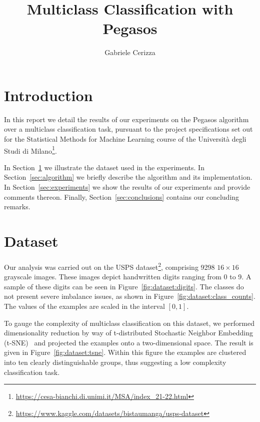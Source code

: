 \documentclass[runningheads]{llncs}
\begin{document}
\title{
    Multiclass Classification with Pegasos
}
\author{Gabriele Cerizza}


\maketitle

\section*{Introduction}
\label{sec:introduction}

In this report we detail the results of our experiments on the Pegasos algorithm~\cite{shalev-pegasos-2011} over a multiclass classification task, pursuant to the project specifications set out for the Statistical Methods for Machine Learning course of the Università degli Studi di Milano\footnote{\url{https://cesa-bianchi.di.unimi.it/MSA/index\_21-22.html}}. 

In Section~\ref{sec:dataset} we illustrate the dataset used in the experiments. In Section~\ref{sec:algorithm} we briefly describe the algorithm and its implementation. In Section~\ref{sec:experiments} we show the results of our experiments and provide comments thereon. Finally, Section~\ref{sec:conclusions} contains our concluding remarks. 

\section{Dataset}
\label{sec:dataset}

Our analysis was carried out on the USPS dataset\footnote{\url{https://www.kaggle.com/datasets/bistaumanga/usps-dataset}}, comprising 9298 $16\times16$ grayscale images. These images depict handwritten digits ranging from 0 to 9. A sample of these digits can be seen in Figure~\ref{fig:dataset:digits}. The classes do not present severe imbalance issues, as shown in Figure~\ref{fig:dataset:class_counts}. The values of the examples are scaled in the interval $[0, 1]$.

To gauge the complexity of multiclass classification on this dataset, we performed dimensionality reduction by way of  t-distributed Stochastic Neighbor Embedding (t-SNE)~\cite{maaten-2008-tsne} and projected the examples onto a two-dimensional space. The result is given in Figure~\ref{fig:dataset:tsne}. Within this figure the examples are clustered into ten clearly distinguishable groups, thus suggesting a low complexity classification task.   
\end{document}
